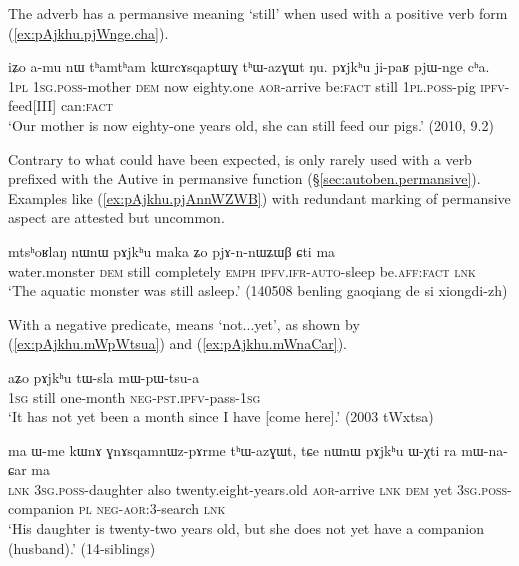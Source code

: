 The adverb  has a permansive meaning `still' when used with a positive verb form (\ref{ex:pAjkhu.pjWnge.cha}).

\begin{exe}
\ex \label{ex:pAjkhu.pjWnge.cha}
\gll iʑo a-mu nɯ tʰamtʰam kɯrcɤsqaptɯɣ tʰɯ-azɣɯt ŋu. pɤjkʰu ji-paʁ pjɯ-nge cʰa. \\
\textsc{1pl} \textsc{1sg}.\textsc{poss}-mother \textsc{dem} now eighty.one \textsc{aor}-arrive be:\textsc{fact} still \textsc{1pl}.\textsc{poss}-pig \textsc{ipfv}-feed[III] can:\textsc{fact} \\
 \glt `Our mother is now eighty-one years old, she can still feed our pigs.' (2010, 9.2)
 \end{exe}
 
 Contrary to what could have been expected,  is only rarely used with a verb prefixed with the Autive in permansive function (§\ref{sec:autoben.permansive}). Examples like (\ref{ex:pAjkhu.pjAnnWZWB}) with redundant marking of permansive aspect are attested but uncommon.
 
\begin{exe}
\ex \label{ex:pAjkhu.pjAnnWZWB}
\gll mtsʰoʁlaŋ nɯnɯ pɤjkʰu maka ʑo pjɤ-n-nɯʑɯβ ɕti ma \\
water.monster \textsc{dem} still completely \textsc{emph} \textsc{ipfv}.\textsc{ifr}-\textsc{auto}-sleep be.\textsc{aff}:\textsc{fact} \textsc{lnk} \\
\glt `The aquatic monster was still  asleep.' (140508 benling gaoqiang de si xiongdi-zh)
  \end{exe}
 
 With a negative predicate,  means `not...yet', as shown by (\ref{ex:pAjkhu.mWpWtsua}) and (\ref{ex:pAjkhu.mWnaCar}).
 
\begin{exe}
\ex \label{ex:pAjkhu.mWpWtsua}
\gll aʑo pɤjkʰu tɯ-sla mɯ-pɯ-tsu-a \\
 \textsc{1sg} still one-month \textsc{neg}-\textsc{pst}.\textsc{ipfv}-pass-\textsc{1sg} \\
 \glt `It has not yet been a month since I have [come here].' (2003 tWxtsa)
\end{exe}

\begin{exe}
\ex \label{ex:pAjkhu.mWnaCar}
\gll ma ɯ-me kɯnɤ ɣnɤsqamnɯz-pɤrme tʰɯ-azɣɯt, tɕe nɯnɯ pɤjkʰu ɯ-χti ra mɯ-na-ɕar ma \\
\textsc{lnk} \textsc{3sg}.\textsc{poss}-daughter also twenty.eight-years.old \textsc{aor}-arrive \textsc{lnk} \textsc{dem} yet \textsc{3sg}.\textsc{poss}-companion \textsc{pl} \textsc{neg}-\textsc{aor}:3\flobv{}-search \textsc{lnk} \\
\glt `His daughter is twenty-two years old, but she does not yet have a companion (husband).' (14-siblings)
\end{exe}

